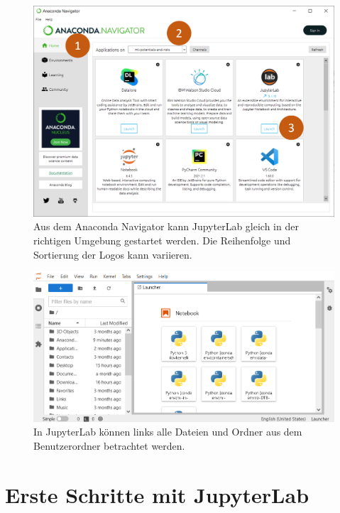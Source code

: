 \documentclass[nobib]{tufte-handout}
\begin{document}
\begin{figure}[h]
  \includegraphics[trim={0 1.5cm 0 0},clip]{anaconda-navigator-jupyterlab--mit-reihenfolge}
  \caption{Aus dem Anaconda Navigator kann JupyterLab gleich in der richtigen Umgebung gestartet werden.%
  Die Reihenfolge und Sortierung der Logos kann variieren.}%
  \label{fig:start-jupyterlab}
\end{figure}

\begin{figure}[h]
  \includegraphics{jupyterlab-running}
  \caption{In JupyterLab können links alle Dateien und Ordner aus dem Benutzerordner betrachtet werden.}%
  \label{fig:inside-jupyterlab}
\end{figure}


\section{Erste Schritte mit JupyterLab}
\end{document}
